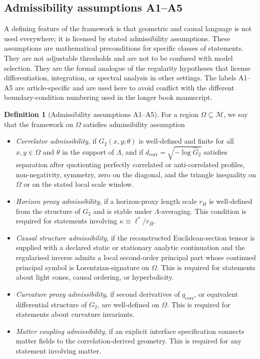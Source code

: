﻿\documentclass[12pt,a4paper]{article}
\theoremstyle{definition}
\newtheorem{definition}[theorem]{Definition}
\begin{document}
\subsection{Admissibility assumptions A1--A5}
\label{sec:admissibility}

A defining feature of the framework is that geometric and causal language is not used everywhere; it is licensed by stated admissibility assumptions. These assumptions are mathematical preconditions for specific classes of statements. They are not adjustable thresholds and are not to be confused with model selection. They are the formal analogue of the regularity hypotheses that license differentiation, integration, or spectral analysis in other settings. The labels A1--A5 are article-specific and are used here to avoid conflict with the different boundary-condition numbering used in the longer book manuscript.

\begin{definition}[Admissibility assumptions A1--A5]
For a region $\Omega \subseteq \mathcal{M}$, we say that the framework on $\Omega$ satisfies admissibility assumption
\begin{itemize}
  \item[(A1)] \emph{Correlator admissibility}, if $G_2(x,y;\theta)$ is well-defined and finite for all $x,y \in \Omega$ and $\theta$ in the support of $\Lambda$, and if $d_{\mathrm{corr}}=\sqrt{-\log\widehat{G}_2}$ satisfies separation after quotienting perfectly correlated or anti-correlated profiles, non-negativity, symmetry, zero on the diagonal, and the triangle inequality on $\Omega$ or on the stated local scale window.
  \item[(A2)] \emph{Horizon proxy admissibility}, if a horizon-proxy length scale $r_H$ is well-defined from the structure of $G_2$ and is stable under $\Lambda$-averaging. This condition is required for statements involving $\kappa \equiv \ell^\ast/r_H$.
  \item[(A3)] \emph{Causal structure admissibility}, if the reconstructed Euclidean-section tensor is supplied with a declared static or stationary analytic continuation and the regularised inverse admits a local second-order principal part whose continued principal symbol is Lorentzian-signature on $\Omega$. This is required for statements about light cones, causal ordering, or hyperbolicity.
  \item[(A4)] \emph{Curvature proxy admissibility}, if second derivatives of $q_{\mathrm{corr}}$, or equivalent differential structure of $G_2$, are well-defined on $\Omega$. This is required for statements about curvature invariants.
  \item[(A5)] \emph{Matter coupling admissibility}, if an explicit interface specification connects matter fields to the correlation-derived geometry. This is required for any statement involving matter.
\end{itemize}
\end{definition}
\end{document}
